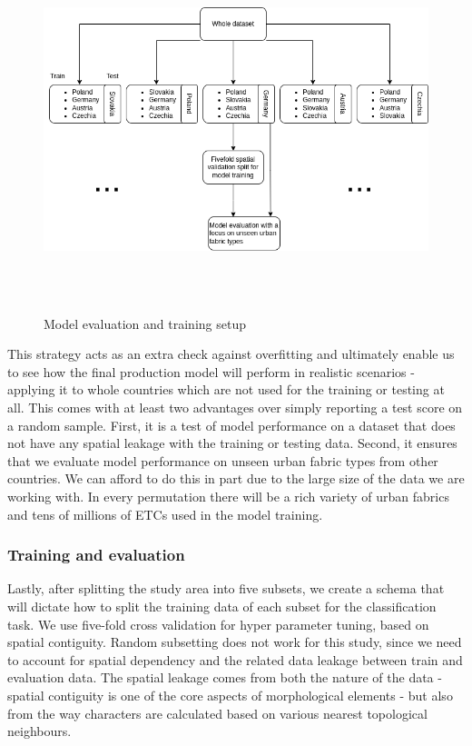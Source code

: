 \documentclass[
  letterpaper,
  DIV=11,
  numbers=noendperiod]{scrartcl}
\begin{document}
\begin{figure}[H]

{\centering \includegraphics[width=\linewidth,height=4.16667in,keepaspectratio]{../figures/algo_design/eval_split.png}

}

\caption{Model evaluation and training setup}

\end{figure}%

This strategy acts as an extra check against overfitting and ultimately
enable us to see how the final production model will perform in
realistic scenarios - applying it to whole countries which are not used
for the training or testing at all. This comes with at least two
advantages over simply reporting a test score on a random sample. First,
it is a test of model performance on a dataset that does not have any
spatial leakage with the training or testing data. Second, it ensures
that we evaluate model performance on unseen urban fabric types from
other countries. We can afford to do this in part due to the large size
of the data we are working with. In every permutation there will be a
rich variety of urban fabrics and tens of millions of ETCs used in the
model training.

\subsubsection{Training and evaluation}\label{training-and-evaluation}

Lastly, after splitting the study area into five subsets, we create a
schema that will dictate how to split the training data of each subset
for the classification task. We use five-fold cross validation for hyper
parameter tuning, based on spatial contiguity. Random subsetting does
not work for this study, since we need to account for spatial dependency
and the related data leakage between train and evaluation data. The
spatial leakage comes from both the nature of the data - spatial
contiguity is one of the core aspects of morphological elements - but
also from the way characters are calculated based on various nearest
topological neighbours.
\end{document}
